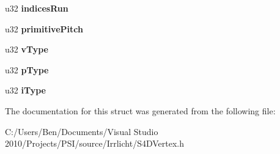 \begin{DoxyCompactItemize}
\item 
\hypertarget{structirr_1_1video_1_1_s_vertex_cache_ae2e3dddca6aab619a98c3bfaeaa82e8e}{u32 {\bfseries indices\-Run}}\label{structirr_1_1video_1_1_s_vertex_cache_ae2e3dddca6aab619a98c3bfaeaa82e8e}

\item 
\hypertarget{structirr_1_1video_1_1_s_vertex_cache_a1296910895f15a2a5b4ff1de01ab7d62}{u32 {\bfseries primitive\-Pitch}}\label{structirr_1_1video_1_1_s_vertex_cache_a1296910895f15a2a5b4ff1de01ab7d62}

\item 
\hypertarget{structirr_1_1video_1_1_s_vertex_cache_aa56eb7cb31c5b6613580af5edbdb11b2}{u32 {\bfseries v\-Type}}\label{structirr_1_1video_1_1_s_vertex_cache_aa56eb7cb31c5b6613580af5edbdb11b2}

\item 
\hypertarget{structirr_1_1video_1_1_s_vertex_cache_a7d23583b152f1410ddf4212fa4637c05}{u32 {\bfseries p\-Type}}\label{structirr_1_1video_1_1_s_vertex_cache_a7d23583b152f1410ddf4212fa4637c05}

\item 
\hypertarget{structirr_1_1video_1_1_s_vertex_cache_a3e5bbefe6830b9823e3385ea32fcae81}{u32 {\bfseries i\-Type}}\label{structirr_1_1video_1_1_s_vertex_cache_a3e5bbefe6830b9823e3385ea32fcae81}

\end{DoxyCompactItemize}


The documentation for this struct was generated from the following file\-:\begin{DoxyCompactItemize}
\item 
C\-:/\-Users/\-Ben/\-Documents/\-Visual Studio 2010/\-Projects/\-P\-S\-I/source/\-Irrlicht/S4\-D\-Vertex.\-h\end{DoxyCompactItemize}
